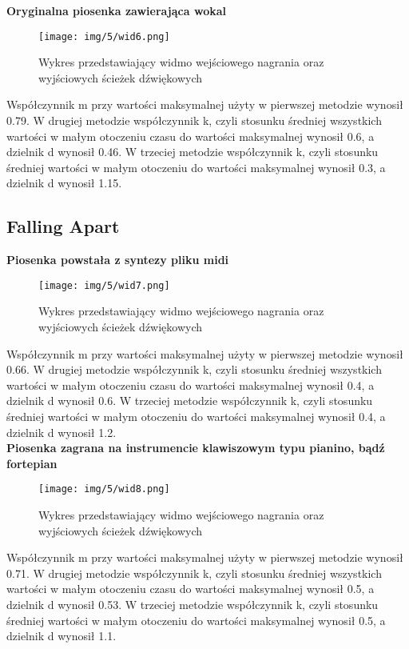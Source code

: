 \textbf{Oryginalna piosenka zawierająca wokal}

\begin{figure}[h]
  \centering
  \texttt{[image: img/5/wid6.png]}
  \caption{Wykres przedstawiający widmo wejściowego nagrania oraz \\wyjściowych ścieżek dźwiękowych}
\end{figure}


\noindent Współczynnik m przy wartości maksymalnej użyty w pierwszej metodzie wynosił 0.79.
W drugiej metodzie współczynnik k, czyli stosunku średniej wszystkich wartości w małym otoczeniu czasu do wartości maksymalnej wynosił 0.6, a dzielnik d wynosił 0.46.
W trzeciej metodzie współczynnik k, czyli stosunku średniej wartości w małym otoczeniu do wartości maksymalnej wynosił 0.3, a dzielnik d wynosił 1.15.

\newpage
\subsection{Falling Apart}

\textbf{Piosenka powstała z syntezy pliku midi}

\begin{figure}[h]
  \centering
  \texttt{[image: img/5/wid7.png]}
  \caption{Wykres przedstawiający widmo wejściowego nagrania oraz \\wyjściowych ścieżek dźwiękowych}
\end{figure}

\noindent Współczynnik m przy wartości maksymalnej użyty w pierwszej metodzie wynosił 0.66.
W drugiej metodzie współczynnik k, czyli stosunku średniej wszystkich wartości w małym otoczeniu czasu do wartości maksymalnej wynosił 0.4, a dzielnik d wynosił 0.6.
W trzeciej metodzie współczynnik k, czyli stosunku średniej wartości w małym otoczeniu do wartości maksymalnej wynosił 0.4, a dzielnik d wynosił 1.2.\\

\textbf{Piosenka zagrana na instrumencie klawiszowym typu pianino, bądź fortepian}

\begin{figure}[h]
  \centering
  \texttt{[image: img/5/wid8.png]}
  \caption{Wykres przedstawiający widmo wejściowego nagrania oraz \\wyjściowych ścieżek dźwiękowych}
\end{figure}

\noindent Współczynnik m przy wartości maksymalnej użyty w pierwszej metodzie wynosił 0.71.
W drugiej metodzie współczynnik k, czyli stosunku średniej wszystkich wartości w małym otoczeniu czasu do wartości maksymalnej wynosił 0.5, a dzielnik d wynosił 0.53.
W trzeciej metodzie współczynnik k, czyli stosunku średniej wartości w małym otoczeniu do wartości maksymalnej wynosił 0.5, a dzielnik d wynosił 1.1.\\

